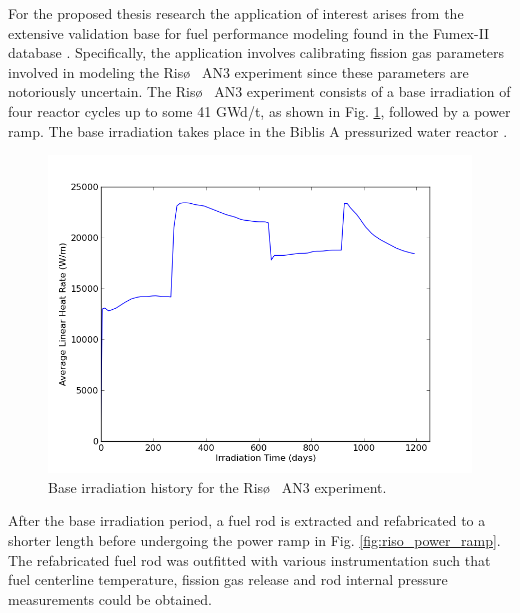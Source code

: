 For the proposed thesis research the application of interest arises from the extensive validation base for fuel performance modeling found in the Fumex-II database \cite{fumex2}. 
Specifically, the application involves calibrating fission gas parameters involved in modeling the Ris\o~ AN3 experiment since these parameters are notoriously uncertain. The Ris\o~ AN3 experiment consists of a base irradiation of four reactor cycles up to some 41 GWd/t, as shown in Fig. \ref{fig:riso_base_irradiation}, followed by a power ramp. The base irradiation takes place in the Biblis A pressurized water reactor \cite{fumex2}. 
\begin{figure}
\caption{\label{fig:riso_base_irradiation}
Base irradiation history for the Ris\o~ AN3 experiment.}
 \begin{center}
  \includegraphics[scale=.75]{./Chapter4/base_irrad.png}
 \end{center}
\end{figure}     
After the base irradiation period, a fuel rod is extracted and refabricated to a shorter length before undergoing the power ramp in Fig. \ref{fig:riso_power_ramp}. The refabricated fuel rod was outfitted with various instrumentation such that fuel centerline temperature, fission gas release and rod internal pressure measurements could be obtained.  
